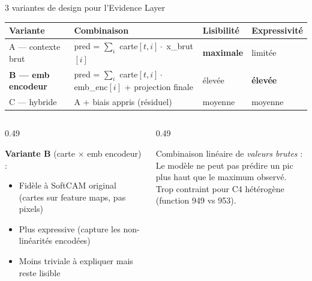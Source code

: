 \documentclass[10pt]{beamer}
\begin{document}
\begin{frame}{3 variantes de design pour l'Evidence Layer}
  \begin{tcolorbox}[colback=blue!3, colframe=blue!50!black, arc=2mm,
                    fonttitle=\bfseries, title=Choix de design — point ouvert]
    \tiny
    \begin{tabular}{lp{4cm}p{2.5cm}p{2.5cm}}
      \toprule
      \textbf{Variante} & \textbf{Combinaison} & \textbf{Lisibilité} & \textbf{Expressivité} \\
      \midrule
      A — contexte brut    & pred = $\sum_i$ carte$[t,i] \cdot$ x\_brut$[i]$  & \textbf{maximale} & limitée \\
      \textbf{B — emb encodeur} & pred = $\sum_i$ carte$[t,i] \cdot$ emb\_enc$[i]$ + projection finale & élevée & \textbf{élevée} \\
      C — hybride          & A + biais appris (résiduel) & moyenne & moyenne \\
      \bottomrule
    \end{tabular}
  \end{tcolorbox}

  \begin{columns}
    \begin{column}{0.49\textwidth}
      \begin{tcolorbox}[colback=green!3, colframe=green!50!black, arc=2mm,
                        fonttitle=\bfseries, title=Recommandation]
        \textbf{Variante B} (carte $\times$ emb encodeur) :
        \begin{itemize}
          \item Fidèle à SoftCAM original (cartes sur feature maps, pas pixels)
          \item Plus expressive (capture les non-linéarités encodées)
          \item Moins triviale à expliquer mais reste lisible
        \end{itemize}
      \end{tcolorbox}
    \end{column}
    \begin{column}{0.49\textwidth}
      \begin{tcolorbox}[colback=red!3, colframe=red!60!black, arc=2mm,
                        fonttitle=\bfseries, title=Risque variante A]
        Combinaison linéaire de \emph{valeurs brutes} :\\
        Le modèle ne peut pas prédire un pic plus haut que le maximum observé.\\
        Trop contraint pour C4 hétérogène (function 949 vs 953).
      \end{tcolorbox}
    \end{column}
  \end{columns}
\end{frame}
\end{document}
